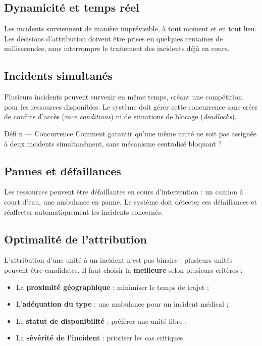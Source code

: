 \documentclass[12pt, a4paper]{report}
\begin{document}
\subsection{Dynamicité et temps réel}

Les incidents surviennent de manière imprévisible, à tout moment et en tout lieu.
Les décisions d'attribution doivent être prises en quelques centaines de millisecondes,
sans interrompre le traitement des incidents déjà en cours.

\subsection{Incidents simultanés}

Plusieurs incidents peuvent survenir en même temps, créant une compétition pour les
ressources disponibles. Le système doit gérer cette concurrence sans créer de conflits
d'accès (\emph{race conditions}) ni de situations de blocage (\emph{deadlocks}).

\begin{alertbox}{Défi n — Concurrence}
Comment garantir qu'une même unité ne soit pas assignée à deux incidents
simultanément, sans mécanisme centralisé bloquant ?
\end{alertbox}

\subsection{Pannes et défaillances}

Les ressources peuvent être défaillantes en cours d'intervention : un camion à court
d'eau, une ambulance en panne. Le système doit détecter ces défaillances et réaffecter
automatiquement les incidents concernés.

\subsection{Optimalité de l'attribution}

L'attribution d'une unité à un incident n'est pas binaire : plusieurs unités peuvent
être candidates. Il faut choisir la \textbf{meilleure} selon plusieurs critères :

\begin{itemize}[leftmargin=*, noitemsep]
  \item La \textbf{proximité géographique} : minimiser le temps de trajet ;
  \item L'\textbf{adéquation du type} : une ambulance pour un incident médical ;
  \item Le \textbf{statut de disponibilité} : préférer une unité libre ;
  \item La \textbf{sévérité de l'incident} : prioriser les cas critiques.
\end{itemize}
\end{document}
